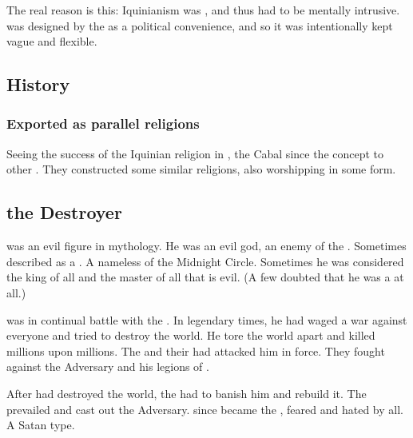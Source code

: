 The real reason is this: 
Iquinianism was , and thus had to be mentally intrusive. 
\Ortaicanism was designed by the \taorthae as a political convenience, and so it was intentionally kept vague and flexible. 










\subsection{History}





\subsubsection{Exported as parallel religions}
Seeing the success of the Iquinian religion in \Azmith, the Cabal since  the concept to other . 
They constructed some similar religions, also worshipping \iquin{} in some form. 









\subsection{\Isphet the Destroyer}
\index{\Isphet}
\Isphet was an evil figure in \Iquinian mythology. 
He was an evil god, an enemy of the \sephiroth. 
Sometimes described as a \qliphah. 
A nameless \qliphah of the Midnight Circle. 
Sometimes he was considered the king of all \qliphoth and the master of all that is evil. 
(A few doubted that he was a \qliphah at all.)

\Isphet was in continual battle with the \sephiroth.
In legendary times, he had waged a war against everyone and tried to destroy the world. 
He tore the world apart and killed millions upon millions. 
The \sephiroth and their  had attacked him in force. 
They fought against the Adversary and his legions of \qliphoth. 

After \Isphet had destroyed the world, the \sephiroth had to banish him and rebuild it. 
The \sephiroth prevailed and cast out the Adversary. 
\Isphet since became the , feared and hated by all. 
A Satan type. 


